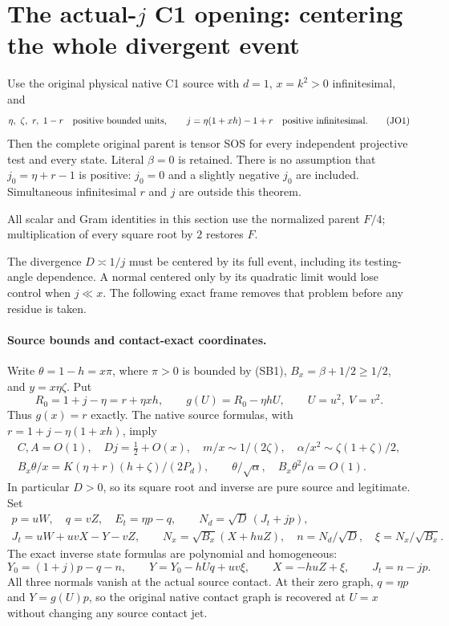 \section{The actual-$j$ C1 opening: centering the whole divergent event}
\label{sec:r13-c1-j-opening}

\begin{theorem}
Use the original physical native C1 source with $d=1$, $x=k^2>0$
infinitesimal, and
\[
 \eta,\ \zeta,\ r,\ 1-r\quad\hbox{positive bounded units},\qquad
 j=\eta(1+xh)-1+r\quad\hbox{positive infinitesimal}.       \tag{JO1}
\]
Then the complete original parent is tensor SOS for every independent
projective test and every state. Literal $\beta=0$ is retained.
There is no assumption that $j_0=\eta+r-1$ is positive: $j_0=0$
and a slightly negative $j_0$ are included. Simultaneous infinitesimal
$r$ and $j$ are outside this theorem.
\end{theorem}

All scalar and Gram identities in this section use the normalized
parent $F/4$; multiplication of every square root by $2$ restores $F$.

The divergence $D\asymp1/j$ must be centered by its full event,
including its testing-angle dependence. A normal centered only by its
quadratic limit would lose control when $j\ll x$. The following exact
frame removes that problem before any residue is taken.

\paragraph{Source bounds and contact-exact coordinates.}
Write $\theta=1-h=x\pi$, where $\pi>0$ is bounded by (SB1),
$B_x=\beta+1/2\ge1/2$, and $y=x\eta\zeta$. Put
\[
 R_0=1+j-\eta=r+\eta xh,\qquad
 g(U)=R_0-\eta hU,\qquad U=u^2,\ V=v^2.
                                                               \tag{JO2}
\]
Thus $g(x)=r$ exactly. The native source formulas, with
$r=1+j-\eta(1+xh)$, imply
\[
 \begin{gathered}
 C,A=O(1),\quad Dj=\tfrac12+O(x),\quad
 m/x\sim1/(2\zeta),\quad
 \alpha/x^2\sim\zeta(1+\zeta)/2,\\
 B_x\theta/x=K(\eta+r)(h+\zeta)/(2P_d),\qquad
 \theta/\sqrt\alpha,\quad B_x\theta^2/\alpha=O(1).
 \end{gathered}                                                \tag{JO3}
\]
In particular $D>0$, so its square root and inverse are pure source
and legitimate. Set
\[
 \begin{gathered}
 p=uW,\quad q=vZ,\quad E_t=\eta p-q,\qquad
 N_d=\sqrt D\,(J_t+jp),\\
 J_t=uW+uvX-Y-vZ,\qquad
 N_x=\sqrt{B_x}(X+huZ),\quad
 n=N_d/\sqrt D,\quad \xi=N_x/\sqrt{B_x}.
 \end{gathered}                                                \tag{JO4}
\]
The exact inverse state formulas are polynomial and homogeneous:
\[
 Y_0=(1+j)p-q-n,\qquad
 Y=Y_0-hUq+uv\xi,\qquad X=-huZ+\xi,\qquad
 J_t=n-jp.                                             \tag{JO5}
\]
All three normals vanish at the actual source contact. At their zero
graph, $q=\eta p$ and $Y=g(U)p$, so the original native contact
graph is recovered at $U=x$ without changing any source contact jet.

